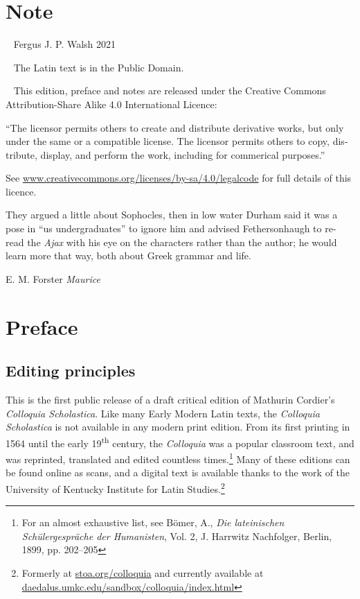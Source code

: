 \documentclass{article}
\begin{document}
\pagebreak
\begin{english}
\tableofcontents

\section*{Note}
\textcopyright~ Fergus J. P. Walsh 2021

\ccPublicDomain~ The Latin text is in the Public Domain.

\ccbynd~ This edition, preface and notes are released under the Creative Commons Attribution-Share Alike 4.0 International Licence:

``The licensor permits others to create and distribute derivative works, but only under the same or a compatible license. The licensor permits others to copy, distribute, display, and perform the work, including for commerical purposes.''

See \url{www.creativecommons.org/licenses/by-sa/4.0/legalcode} for full details of this licence.
\vfill
\setlength{\parindent}{1em}

\epigraph{They argued a little about Sophocles, then in low water Durham said it was a pose in ``us undergraduates'' to ignore him and advised Fethersonhaugh to re-read the \emph{Ajax} with his eye on the characters rather than the author; he would learn more that way, both about Greek grammar and life.}{E. M. Forster \emph{Maurice}}

\pagebreak
{}
{}
\section*{Preface}
\subsection*{Editing principles}

This is the first public release of a draft critical edition of Mathurin Cordier's \emph{Colloquia Scholastica}. Like many Early Modern Latin texts, the \emph{Colloquia Scholastica} is not available in any modern print edition. From its first printing in 1564 until the early 19\textsuperscript{th} century, the \emph{Colloquia} was a popular classroom text, and was reprinted, translated and edited countless times.\footnote{For an almost exhaustive list, see Bömer, A., \emph{Die lateinischen Schülergespräche der Humanisten}, Vol. 2, J. Harrwitz Nachfolger, Berlin, 1899, pp. 202--205} Many of these editions can be found online as scans, and a digital text is available thanks to the work of the University of Kentucky Institute for Latin Studies.\footnote{Formerly at \url{stoa.org/colloquia} and currently available at \url{daedalus.umkc.edu/sandbox/colloquia/index.html}}


\end{english}
\end{document}
